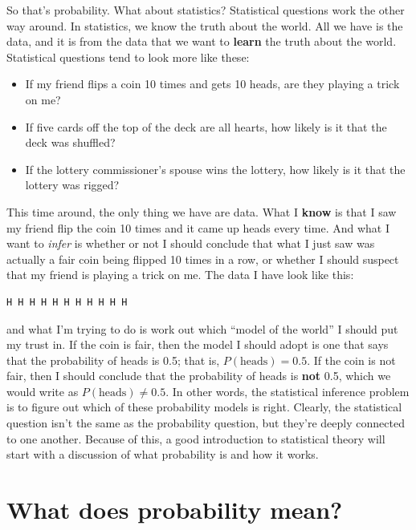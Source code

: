 \documentclass[
  letterpaper,
  DIV=11,
  numbers=noendperiod]{scrreprt}
\begin{document}
So that's probability. What about statistics? Statistical questions work
the other way around. In statistics, we know the truth about the world.
All we have is the data, and it is from the data that we want to
\textbf{learn} the truth about the world. Statistical questions tend to
look more like these:

\begin{itemize}
\item
  If my friend flips a coin 10 times and gets 10 heads, are they playing
  a trick on me?
\item
  If five cards off the top of the deck are all hearts, how likely is it
  that the deck was shuffled?
\item
  If the lottery commissioner's spouse wins the lottery, how likely is
  it that the lottery was rigged?
\end{itemize}

This time around, the only thing we have are data. What I \textbf{know}
is that I saw my friend flip the coin 10 times and it came up heads
every time. And what I want to \emph{infer} is whether or not I should
conclude that what I just saw was actually a fair coin being flipped 10
times in a row, or whether I should suspect that my friend is playing a
trick on me. The data I have look like this:

\begin{verbatim}
H H H H H H H H H H H
\end{verbatim}

and what I'm trying to do is work out which ``model of the world'' I
should put my trust in. If the coin is fair, then the model I should
adopt is one that says that the probability of heads is 0.5; that is,
\(P(\mbox{heads}) = 0.5\). If the coin is not fair, then I should
conclude that the probability of heads is \textbf{not} 0.5, which we
would write as \(P(\mbox{heads}) \neq 0.5\). In other words, the
statistical inference problem is to figure out which of these
probability models is right. Clearly, the statistical question isn't the
same as the probability question, but they're deeply connected to one
another. Because of this, a good introduction to statistical theory will
start with a discussion of what probability is and how it works.

\section{What does probability mean?}\label{what-does-probability-mean}
\end{document}
